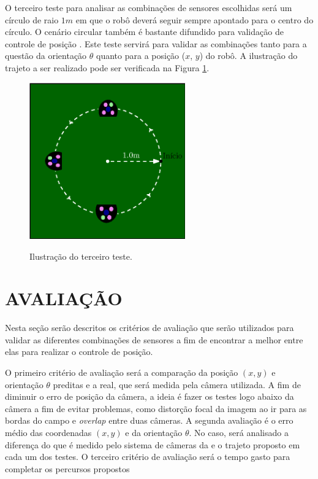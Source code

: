 \documentclass[acronym, symbols, table]{fei}
\begin{document}
		O terceiro teste para analisar as combinações de sensores escolhidas será um círculo de raio $1m$ em que o robô deverá seguir sempre apontado para o centro do círculo. O cenário circular também é bastante difundido para validação de controle de posição \cites{suliman2009mobile}{marton2013two}{rigatos2010extended}{eman2020mobile}. Este teste servirá para validar as combinações tanto para a questão da orientação $\theta$ quanto para a posição ($x$, $y$) do robô. A ilustração do trajeto a ser realizado pode ser verificada na Figura \ref{fig:metodologia_teste_3}.
		
		\begin{figure}[!htb]
			\centering
			\caption{Ilustração do terceiro teste.}
			\includegraphics[width=0.6\textwidth]{teste_3.eps}
			\label{fig:metodologia_teste_3}
		\end{figure}
		
	\section{AVALIAÇÃO}
	
		Nesta seção serão descritos os critérios de avaliação que serão utilizados para validar as diferentes combinações de sensores a fim de encontrar a melhor entre elas para realizar o controle de posição.
		
		O primeiro critério de avaliação será a comparação da posição $(x, y)$ e orientação $\theta$ preditas e a real, que será medida pela câmera utilizada. A fim de diminuir o erro de posição da câmera, a ideia é fazer os testes logo abaixo da câmera a fim de evitar problemas, como distorção focal da imagem ao ir para as bordas do campo e \textit{overlap} entre duas câmeras. A segunda avaliação é o erro médio das coordenadas $(x ,y)$ e da orientação $\theta$. No caso, será analisado a diferença do que é medido pelo sistema de câmeras da  e o trajeto proposto em cada um dos testes. O terceiro critério de avaliação será o tempo gasto para completar os percursos propostos
		
\end{document}

